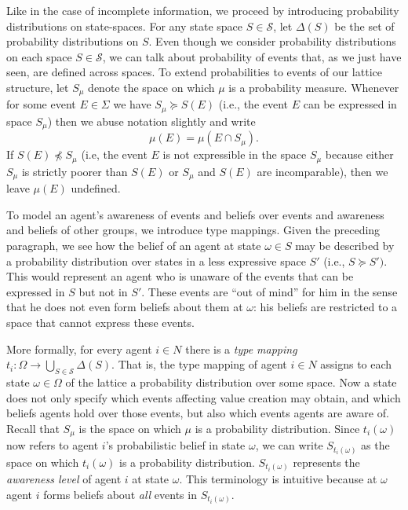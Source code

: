 \documentclass[
11pt,
titlepage,
reqno,
]{article}%
\theoremstyle{definition}
\begin{document}
Like in the case of incomplete information, we proceed by introducing probability distributions on state-spaces. For any state space $S \in \mathcal{S}$, let $\Delta(S)$ be the set of probability distributions on $S$. Even though we consider probability distributions on each space $S \in \mathcal{S}$, we can talk about probability of events that, as we just have seen, are defined across spaces. To extend probabilities to events of our lattice structure, let $S_{\mu}$ denote the space on which $\mu$ is a probability measure. Whenever for some event $E \in \Sigma$ we have $S_{\mu} \succeq S(E)$ (i.e., the event $E$ can be expressed in space $S_{\mu}$) then we abuse notation slightly and write
\begin{equation*}
\mu \left( E \right) = \mu \left( E\cap S_{\mu}\right).
\end{equation*}
If $S(E) \npreceq S_{\mu}$ (i.e, the event $E$ is not expressible in the space $S_{\mu}$ because either $S_{\mu}$ is strictly poorer than $S(E)$ or $S_{\mu}$ and $S(E)$ are incomparable), then we leave $\mu(E)$ undefined.

To model an agent's awareness of events and beliefs over events and awareness and beliefs of other groups, we introduce type mappings. Given the preceding paragraph, we see how the belief of an agent at state $\omega \in S$ may be described by a probability distribution over states in a less expressive space $S'$ (i.e., $S \succeq S')$. This would represent an agent who is unaware of the events that can be expressed in $S$ but not in $S'$. These events are ``out of mind'' for him in the sense that he does not even form beliefs about them at $\omega$:  his beliefs are restricted to a space that cannot express these events.

More formally, for every agent $i \in N$ there is a \textit{type mapping} $t_{i}: \Omega \longrightarrow \bigcup_{S \in \mathcal{S}} \Delta(S)$. That is, the type mapping of agent $i \in N$ assigns to each state $\omega \in \Omega$ of the lattice a probability distribution over some space. Now a state does not only specify which events affecting value creation may obtain, and which beliefs agents hold over those events, but also which events agents are aware of. Recall that $S_{\mu}$ is the space on which $\mu$ is a probability distribution. Since $t_i(\omega)$ now refers to agent $i$'s probabilistic belief in state $\omega$, we can write $S_{t_i(\omega)}$ as the space on which $t_i(\omega)$ is a probability distribution. $S_{t_i(\omega)}$ represents the \emph{awareness level} of agent $i$ at state $\omega$. This terminology is intuitive because at $\omega$ agent $i$ forms beliefs about \textit{all} events in $S_{t_i(\omega)}$.
\end{document}
